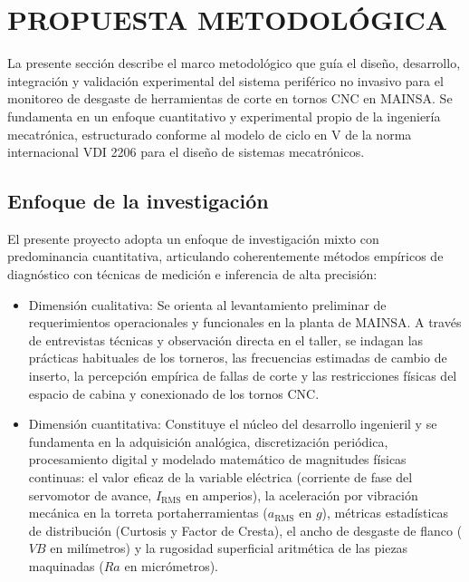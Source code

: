 \newpage
{}
\section{PROPUESTA METODOLÓGICA}

La presente sección describe el marco metodológico que guía el diseño, desarrollo, integración y validación experimental del sistema periférico no invasivo para el monitoreo de desgaste de herramientas de corte en tornos CNC en MAINSA. Se fundamenta en un enfoque cuantitativo y experimental propio de la ingeniería mecatrónica, estructurado conforme al modelo de ciclo en V de la norma internacional VDI 2206 para el diseño de sistemas mecatrónicos.

\subsection{Enfoque de la investigación}
El presente proyecto adopta un enfoque de investigación mixto con predominancia cuantitativa, articulando coherentemente métodos empíricos de diagnóstico con técnicas de medición e inferencia de alta precisión:
\begin{itemize}
    \item Dimensión cualitativa: Se orienta al levantamiento preliminar de requerimientos operacionales y funcionales en la planta de MAINSA. A través de entrevistas técnicas y observación directa en el taller, se indagan las prácticas habituales de los torneros, las frecuencias estimadas de cambio de inserto, la percepción empírica de fallas de corte y las restricciones físicas del espacio de cabina y conexionado de los tornos CNC.
    \item Dimensión cuantitativa: Constituye el núcleo del desarrollo ingenieril y se fundamenta en la adquisición analógica, discretización periódica, procesamiento digital y modelado matemático de magnitudes físicas continuas: el valor eficaz de la variable eléctrica (corriente de fase del servomotor de avance, $I_{\text{RMS}}$ en amperios), la aceleración por vibración mecánica en la torreta portaherramientas ($a_{\text{RMS}}$ en $g$), métricas estadísticas de distribución (Curtosis y Factor de Cresta), el ancho de desgaste de flanco ($VB$ en milímetros) y la rugosidad superficial aritmética de las piezas maquinadas ($Ra$ en micrómetros).
\end{itemize}

